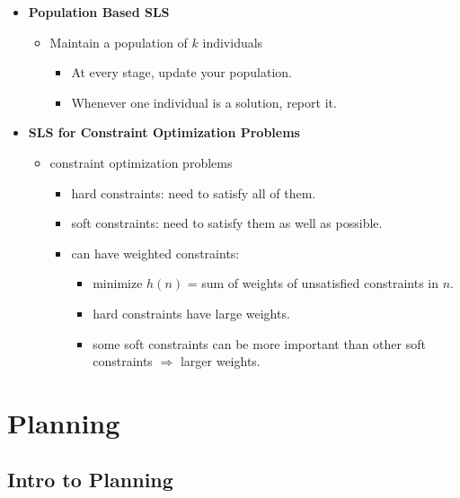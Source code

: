 \documentclass{article}
\begin{document}
\begin{itemize}
\begin{itemize}
\begin{itemize}
                \end{itemize}
        \end{itemize}
    \item \textbf{Population Based SLS}
        \begin{itemize}
            \item Maintain a population of $k$ individuals
                \begin{itemize}
                    \item At every stage, update your population.
                    \item Whenever one individual is a solution, report it.
                \end{itemize}
        \end{itemize}
    \item \textbf{SLS for Constraint Optimization Problems}
        \begin{itemize}
            \item constraint optimization problems
                \begin{itemize}
                    \item hard constraints: need to satisfy all of them.
                    \item soft constraints: need to satisfy them as well as possible.
                    \item can have weighted constraints:
                        \begin{itemize}
                            \item minimize $h(n)$ = sum of weights of unsatisfied constraints in $n$.
                            \item hard constraints have large weights.
                            \item some soft constraints can be more important than other soft constraints $\Rightarrow$ larger weights.
                        \end{itemize}
                \end{itemize}
        \end{itemize}
\end{itemize}

\section{Planning}

\subsection{Intro to Planning}
\end{document}
